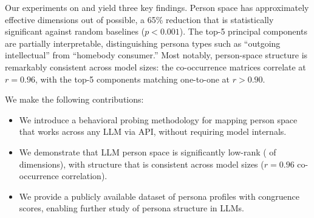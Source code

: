 Our experiments on \nano and \mini yield three key findings.
Person space has approximately \effrank{} effective dimensions out of \nprefs{} possible, a 65\% reduction that is statistically significant against random baselines ($p < 0.001$).
The top-5 principal components are partially interpretable, distinguishing persona types such as ``outgoing intellectual'' from ``homebody consumer.''
Most notably, person-space structure is remarkably consistent across model sizes: the co-occurrence matrices correlate at $r = 0.96$, with the top-5 components matching one-to-one at $r > 0.90$.

We make the following contributions:
\begin{itemize}[leftmargin=*,itemsep=0pt,topsep=0pt]
    \item We introduce a behavioral probing methodology for mapping person space that works across any LLM via API, without requiring model internals.
    \item We demonstrate that LLM person space is significantly low-rank (\effrank{} of \nprefs{} dimensions), with structure that is consistent across model sizes ($r = 0.96$ co-occurrence correlation).
    \item We provide a publicly available dataset of \nprofiles{} persona profiles with congruence scores, enabling further study of persona structure in LLMs.
\end{itemize}
